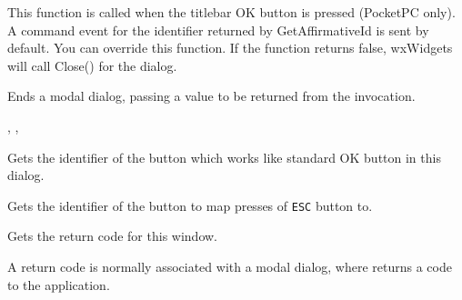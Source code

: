
This function is called when the titlebar OK button is pressed (PocketPC only).
A command event for the identifier returned by GetAffirmativeId is sent by
default. You can override this function. If the function returns false, wxWidgets
will call Close() for the dialog.


\label{wxdialogendmodal}


Ends a modal dialog, passing a value to be returned from the \rtfsp
invocation.




,\rtfsp
{},\rtfsp
{}


\label{wxdialoggetaffirmativeid}


Gets the identifier of the button which works like standard OK button in this
dialog.




\label{wxdialoggetescapeid}


Gets the identifier of the button to map presses of \texttt{\textsc{ESC}}
button to.




\label{wxdialoggetreturncode}


Gets the return code for this window.


A return code is normally associated with a modal dialog, where  returns
a code to the application.

